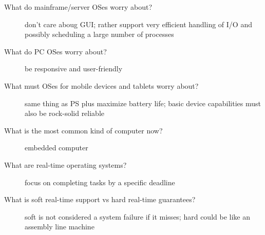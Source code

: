 \documentclass[10pt]{article}
\begin{document}
\begin{description}
\item[What do mainframe/server OSes worry about?]
  don't care aboug GUI; rather support very efficient handling of I/O and possibly scheduling a large number of processes
\item[What do PC OSes worry about?]
  be responsive and user-friendly
\item[What must OSes for mobile devices and tablets worry about?]
  same thing as PS plus maximize battery life; basic device capabilities must also be rock-solid reliable
\item[What is the most common kind of computer now?]
  embedded computer
\item[What are real-time operating systems?]
  focus on completing tasks by a specific deadline
\item[What is soft real-time support vs hard real-time guarantees?]
  soft is not considered a system failure if it misses; hard could be like an assembly line machine
\end{description}
\end{document}
